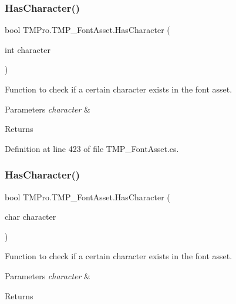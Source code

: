 \subsubsection{\texorpdfstring{HasCharacter()}{HasCharacter()}\hspace{0.1cm}{\footnotesize\ttfamily [1/3]}}
{\footnotesize\ttfamily bool T\+M\+Pro.\+T\+M\+P\+\_\+\+Font\+Asset.\+Has\+Character (\begin{DoxyParamCaption}\item[{int}]{character }\end{DoxyParamCaption})}



Function to check if a certain character exists in the font asset. 


\begin{DoxyParams}{Parameters}
{\em character} & \\
\hline
\end{DoxyParams}
\begin{DoxyReturn}{Returns}

\end{DoxyReturn}


Definition at line 423 of file T\+M\+P\+\_\+\+Font\+Asset.\+cs.

\mbox{\label{class_t_m_pro_1_1_t_m_p___font_asset_a2666ef452a0079b5595353c91b94bf3e}} 
\subsubsection{\texorpdfstring{HasCharacter()}{HasCharacter()}\hspace{0.1cm}{\footnotesize\ttfamily [2/3]}}
{\footnotesize\ttfamily bool T\+M\+Pro.\+T\+M\+P\+\_\+\+Font\+Asset.\+Has\+Character (\begin{DoxyParamCaption}\item[{char}]{character }\end{DoxyParamCaption})}



Function to check if a certain character exists in the font asset. 


\begin{DoxyParams}{Parameters}
{\em character} & \\
\hline
\end{DoxyParams}
\begin{DoxyReturn}{Returns}

\end{DoxyReturn}


